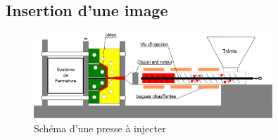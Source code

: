 \documentclass[b,e,cours]{D:/Dropbox/enseignement/CPGE/raphaelpoiree/paquets/classe_kara}
\begin{document}
\subsection{Insertion d'une image}
\begin{frame}
	\begin{figure}[h]
		\begin{center}
			\includegraphics[width=0.8\textwidth]{img/schema_presse_a_injecter.pdf} 
			\caption{Schéma d'une presse à injecter}
			\label{schema_presse_a_injecter}
		\end{center}
	\end{figure}
\end{frame}
\end{document}
